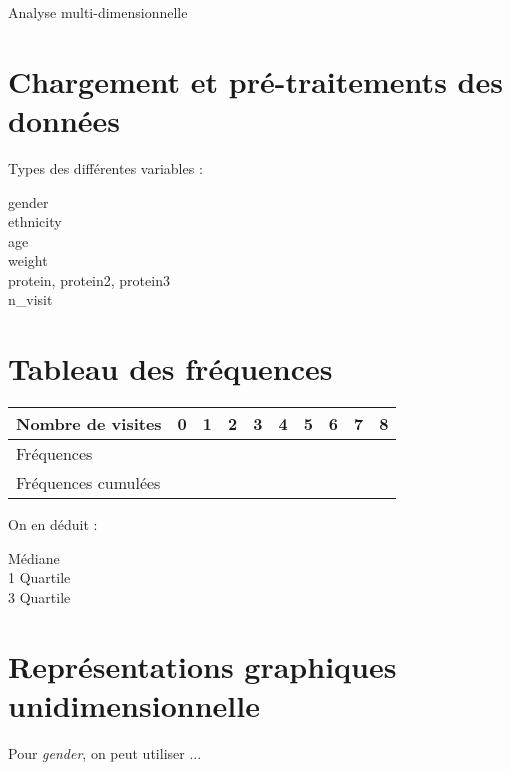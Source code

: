 \documentclass{article}
\begin{document}
\begin{center}
    {\Huge Analyse multi-dimensionnelle}
\end{center}

\section{Chargement et pré-traitements des données}

Types des différentes variables :
\begin{description}
    \item[gender] 
    \item[ethnicity] 
    \item[age] 
    \item[weight] 
    \item[protein, protein2, protein3] 
    \item[n\_visit] 
\end{description}


\section{Tableau des fréquences}

\begin{table}[h] 
    \centering
    \begin{tabular}{l|c|c|c|c|c|c|c|c|c}
        Nombre de visites & 0 & 1 & 2 & 3 & 4 & 5 & 6 & 7 & 8 \\ \hline
        Fréquences & & & & & & & & &\\ 
        Fréquences cumulées & & & & & & & & &\\
    \end{tabular}
\end{table}

On en déduit : %
\begin{description}
    \item[Médiane] 
    \item[1\ier{} Quartile]
    \item[3\ieme{} Quartile]
\end{description}

\section{Représentations graphiques unidimensionnelle}

\begin{figure}[h] %
    \centering
\end{figure}
Pour \emph{gender}, on peut utiliser ... %
\end{document}

